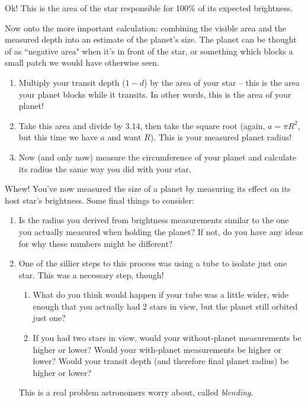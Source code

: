 \documentclass[11pt]{article}
\begin{document}
\noindent
Ok! This is the area of the star responsible for 100\% of its expected brightness.

\medskip \noindent
Now onto the more important calculation: combining the visible area and the measured depth into an estimate of the planet's size. The planet can be thought of as ``negative area" when it's in front of the star, or something which blocks a small patch we would have otherwise seen. 

\begin{enumerate}[resume]
    \item Multiply your transit depth ($1-d$) by the area of your star -- this is the area your planet blocks while it transits. In other words, this is the area of your planet!
    
    \item Take this area and divide by 3.14, then take the square root (again, $a = \pi R^2$, but this time we have $a$ and want $R$). This is your measured planet radius! 
    
    \item Now (and only now) measure the circumference of your planet and calculate its radius the same way you did with your star. 
\end{enumerate}


\medskip \noindent
Whew! You've now measured the size of a planet by measuring its effect on its host star's brightness. Some final things to consider:

\begin{enumerate}[resume]
    \item Is the radius you derived from brightness measurements similar to the one you actually measured when holding the planet? If not, do you have any ideas for why these numbers might be different?
    
    \item One of the sillier steps to this process was using a tube to isolate just one star. This was a necessary step, though! 
    \begin{enumerate}
        \item What do you think would happen if your tube was a little wider, wide enough that you actually had 2 stars in view, but the planet still orbited just one?
        
        \item If you had two stars in view, would your without-planet measurements be higher or lower? Would your with-planet measurements be higher or lower? Would your transit depth (and therefore final planet radius) be higher or lower?
        
    \end{enumerate}  
    
    This is a real problem astronomers worry about, called \emph{blending}.
\end{enumerate}
\end{document}
